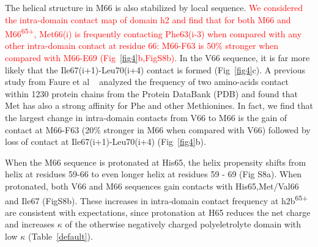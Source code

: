 \documentclass[journal=jacsat,manuscript=article]{achemso}
\newcommand{\ruchi}[1]{\textcolor{red}{#1}}
\begin{document}
The helical structure in M66 is also stabilized by local sequence.  \ruchi{ We considered the intra-domain contact map of domain h2 and find that for both M66 and M66\textsuperscript{65+}, Met66(i) is frequently contacting Phe63(i-3) when compared with any other intra-domain contact at residue 66: M66-F63 is 50\% stronger when compared with M66-E69 (Fig~\ref{fig4}b,FigS8b). } In the V66 sequence, it is far more likely that the Ile67(i+1)-Leu70(i+4) contact is formed (Fig~\ref{fig4}c).
A previous study from Faure et al ~\cite {Faure2008} analyzed the frequency of two amino-acids contact within 1230 protein chains from the Protein DataBank (PDB) and found that Met has also a strong affinity for Phe and other Methionines. In fact, we find that the largest change in intra-domain contacts from V66 to M66 is the gain of contact at M66-F63 (20\% stronger in M66 when compared with V66) followed by loss of contact at Ile67(i+1)-Leu70(i+4) (Fig~\ref{fig4}b). 

When the M66 sequence is protonated at His65, the helix propensity shifts from helix at residues 59-66 to even longer helix at residues 59 - 69 (Fig S8a). When protonated, both V66 and M66 sequences gain contacts with His65,Met/Val66 and Ile67 (FigS8b). These increases in intra-domain contact frequency at h2b\textsuperscript{65+} are consistent with expectations, since protonation at H65 reduces the net charge and increases $\kappa$ of the otherwise negatively charged polyeletrolyte domain with low $\kappa$ (Table~\ref{default}). 


 
\clearpage
\end{document}
